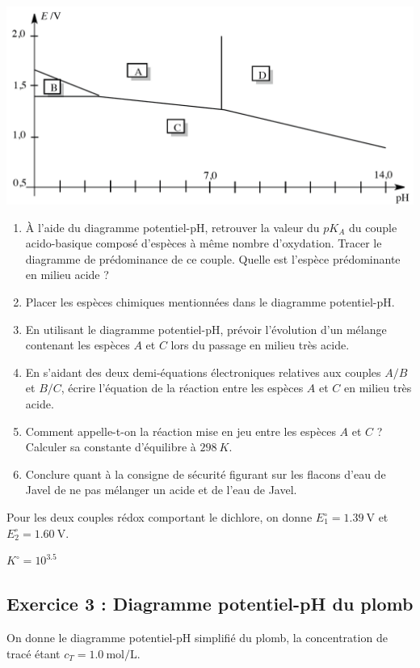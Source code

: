 \includegraphics[width=\textwidth]{Images/mpsi_s25_ex02.png}

\begin{enumerate}
	\item À l'aide du diagramme potentiel-pH, retrouver la valeur du $pK_A$ du couple acido-basique composé d'espèces à même nombre d'oxydation. Tracer le diagramme de prédominance de ce couple. Quelle est l'espèce prédominante en milieu acide ?
	\item Placer les espèces chimiques mentionnées dans le diagramme potentiel-pH.
	\item En utilisant le diagramme potentiel-pH, prévoir l'évolution d'un mélange contenant les espèces $A$ et $C$ lors du passage en milieu très acide.
	\item En s'aidant des deux demi-équations électroniques relatives aux couples $A/B$ et $B/C$, écrire l'équation de la réaction entre les espèces $A$ et $C$ en milieu très acide.
	\item Comment appelle-t-on la réaction mise en jeu entre les espèces $A$ et $C$ ? Calculer sa  constante d'équilibre à $\SI{298}{K}$.
	\item Conclure quant à la consigne de sécurité figurant sur les flacons d'eau de Javel de ne pas mélanger un acide et de l'eau de Javel.
\end{enumerate}

 Pour les deux couples rédox comportant le dichlore, on donne $E^\circ_1 = \SI{1.39}{\volt}$ et $E^\circ_2 = \SI{1.60}{\volt}$.

 $K^\circ = 10^{3.5}$

\subsection{Exercice 3 : Diagramme potentiel-pH du plomb}

On donne le diagramme potentiel-pH simplifié du plomb, la concentration de tracé étant $c_T = \SI{1.0}{\mol\per\liter}$.

